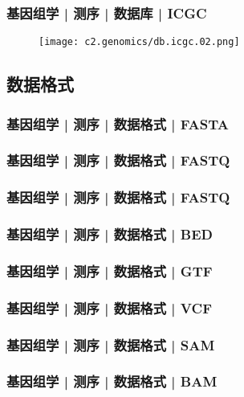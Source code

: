 \begin{frame}
  \frametitle{基因组学 | 测序 | 数据库 | ICGC}
  \begin{figure}
    \centering
    \texttt{[image: c2.genomics/db.icgc.02.png]}
  \end{figure}
\end{frame}
    
\subsection{数据格式}
\begin{frame}[label=current]
  \frametitle{基因组学 | 测序 | 数据格式 | FASTA}
\end{frame}
    
\begin{frame}[label=current]
  \frametitle{基因组学 | 测序 | 数据格式 | FASTQ}
\end{frame}
    
\begin{frame}[label=current]
  \frametitle{基因组学 | 测序 | 数据格式 | FASTQ}
\end{frame}
    
\begin{frame}[label=current]
  \frametitle{基因组学 | 测序 | 数据格式 | BED}
\end{frame}
    
\begin{frame}[label=current]
  \frametitle{基因组学 | 测序 | 数据格式 | GTF}
\end{frame}
    
\begin{frame}[label=current]
  \frametitle{基因组学 | 测序 | 数据格式 | VCF}
\end{frame}
    
\begin{frame}[label=current]
  \frametitle{基因组学 | 测序 | 数据格式 | SAM}
\end{frame}
    
\begin{frame}[label=current]
  \frametitle{基因组学 | 测序 | 数据格式 | BAM}
\end{frame}
    
